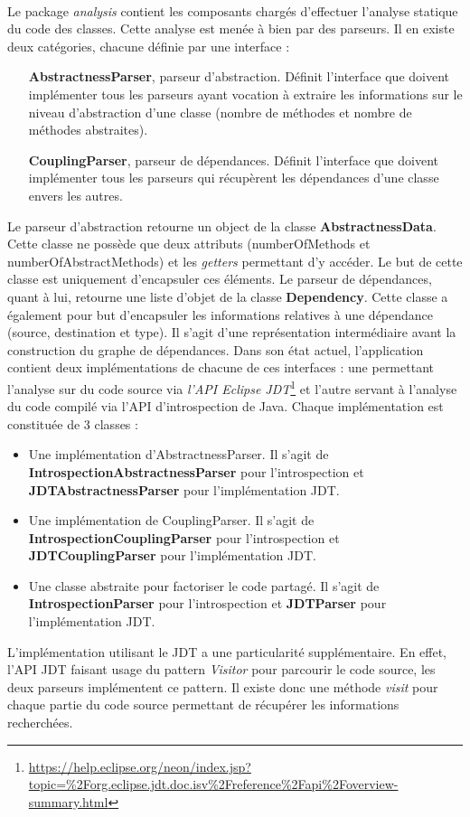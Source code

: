 \documentclass{scrartcl}
\begin{document}
    \paragraph{} Le package \textit{analysis} contient les composants chargés d'effectuer l'analyse statique du code des classes. Cette analyse est menée à bien par des parseurs. Il en existe deux catégories, chacune définie par une interface :
    \begin{itemize}
    	\item[\textbf{AbstractnessParser}, parseur d'abstraction.] Définit l'interface que doivent implémenter tous les parseurs ayant vocation à extraire les informations sur le niveau d'abstraction d'une classe (nombre de méthodes et nombre de méthodes abstraites).
    	\item[\textbf{CouplingParser}, parseur de dépendances.] Définit l'interface que doivent implémenter tous les parseurs qui récupèrent les dépendances d'une classe envers les autres.
    \end{itemize}
    Le parseur d'abstraction retourne un object de la classe \textbf{AbstractnessData}. Cette classe ne possède que deux attributs (numberOfMethods et numberOfAbstractMethods) et les \textit{getters} permettant d'y accéder. Le but de cette classe est uniquement d'encapsuler ces éléments.
    Le parseur de dépendances, quant à lui, retourne une liste d'objet de la classe \textbf{Dependency}. Cette classe a également pour but d'encapsuler les informations relatives à une dépendance (source, destination et type). Il s'agit d'une représentation intermédiaire avant la construction du graphe de dépendances.
    Dans son état actuel, l'application contient deux implémentations de chacune de ces interfaces : une permettant l'analyse sur du code source via \emph{l'API Eclipse JDT}\footnote{\url{https://help.eclipse.org/neon/index.jsp?topic=\%2Forg.eclipse.jdt.doc.isv\%2Freference\%2Fapi\%2Foverview-summary.html}} et l'autre servant à l'analyse du code compilé via l'API d'introspection de Java. Chaque implémentation est constituée de 3 classes :
    \begin{itemize}
    	\item Une implémentation d'AbstractnessParser. Il s'agit de \textbf{IntrospectionAbstractnessParser} pour l'introspection et \textbf{JDTAbstractnessParser} pour l'implémentation JDT.
    	\item Une implémentation de CouplingParser. Il s'agit de \textbf{IntrospectionCouplingParser} pour l'introspection et \textbf{JDTCouplingParser} pour l'implémentation JDT.
    	\item Une classe abstraite pour factoriser le code partagé. Il s'agit de \textbf{IntrospectionParser} pour l'introspection et \textbf{JDTParser} pour l'implémentation JDT.
	\end{itemize}
	L'implémentation utilisant le JDT a une particularité supplémentaire. En effet, l'API JDT faisant usage du pattern \emph{Visitor} pour parcourir le code source, les deux parseurs implémentent ce pattern. Il existe donc une méthode \emph{visit} pour chaque partie du code source permettant de récupérer les informations recherchées.
	
\end{document}

